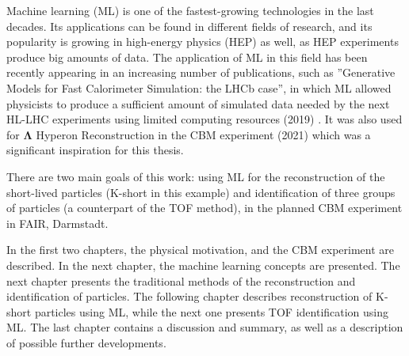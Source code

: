 %
%
\pagestyle{fancy}
\thispagestyle{fancy}
Machine learning (ML) is one of the fastest-growing technologies in the last decades. 
Its applications can be found in different fields of research, and its popularity is growing in high-energy physics (HEP) as well, as HEP experiments produce big amounts of data.
The application of ML in this field has been recently appearing in an increasing number of publications, such as ''Generative Models for Fast Calorimeter Simulation: the LHCb case'', in which ML allowed physicists to produce a sufficient amount of simulated data needed by the next HL-LHC experiments using limited computing resources (2019) \cite{lhcb}.
It was also used for $\mathbf{\Lambda}$ Hyperon Reconstruction in the CBM experiment (2021) \cite{shahid} which was a significant inspiration for this thesis. 

There are two main goals of this work: using ML for the reconstruction of the short-lived particles (K-short in this example) and identification of three groups of particles (a counterpart of the TOF method), in the planned CBM experiment in FAIR, Darmstadt. 

In the first two chapters, the physical motivation, and the CBM experiment are described. 
In the next chapter, the machine learning concepts are presented. 
The next chapter presents the traditional methods of the reconstruction and identification of particles.  
The following chapter describes reconstruction of K-short particles using ML, while the next one presents TOF identification using ML. 
The last chapter contains a discussion and summary, as well as a description of possible further developments. 